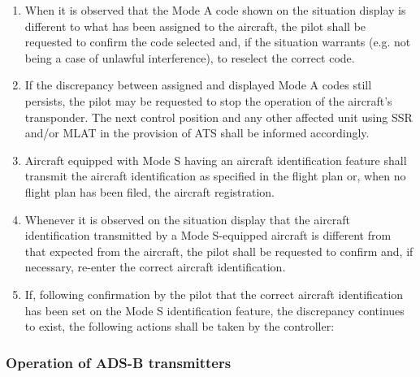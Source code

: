 \begin{enumerate}
    \item When it is observed that the Mode A code shown on the situation display is different to what has been assigned to the aircraft, the pilot shall be requested to confirm the code selected and, if the situation warrants (e.g. not being a case of unlawful interference), to reselect the correct code.
    \item If the discrepancy between assigned and displayed Mode A codes still persists, the pilot may be requested to stop the operation of the aircraft's transponder. The next control position and any other affected unit using SSR and/or MLAT in the provision of ATS shall be informed accordingly.
    \item Aircraft equipped with Mode S having an aircraft identification feature shall transmit the aircraft identification as specified in the flight plan or, when no flight plan has been filed, the aircraft registration.
    \item Whenever it is observed on the situation display that the aircraft identification transmitted by a Mode S-equipped aircraft is different from that expected from the aircraft, the pilot shall be requested to confirm and, if necessary, re-enter the correct aircraft identification.
    \item If, following confirmation by the pilot that the correct aircraft identification has been set on the Mode S identification feature, the discrepancy continues to exist, the following actions shall be taken by the controller:

\end{enumerate}

\subsubsection{Operation of ADS-B transmitters}

